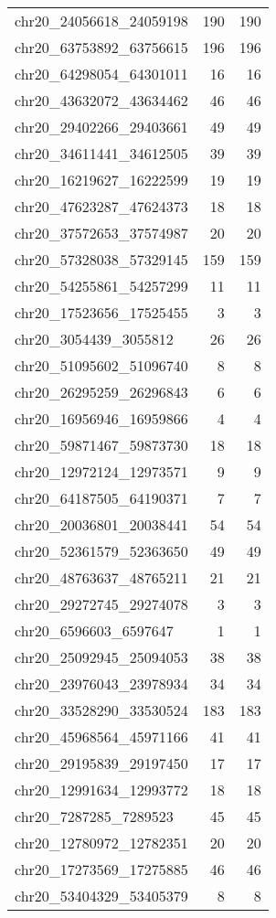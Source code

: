 \begin{longtable}{lrr}
chr20_24056618_24059198 & 190 & 190 \\
chr20_63753892_63756615 & 196 & 196 \\
chr20_64298054_64301011 & 16 & 16 \\
chr20_43632072_43634462 & 46 & 46 \\
chr20_29402266_29403661 & 49 & 49 \\
chr20_34611441_34612505 & 39 & 39 \\
chr20_16219627_16222599 & 19 & 19 \\
chr20_47623287_47624373 & 18 & 18 \\
chr20_37572653_37574987 & 20 & 20 \\
chr20_57328038_57329145 & 159 & 159 \\
chr20_54255861_54257299 & 11 & 11 \\
chr20_17523656_17525455 & 3 & 3 \\
chr20_3054439_3055812 & 26 & 26 \\
chr20_51095602_51096740 & 8 & 8 \\
chr20_26295259_26296843 & 6 & 6 \\
chr20_16956946_16959866 & 4 & 4 \\
chr20_59871467_59873730 & 18 & 18 \\
chr20_12972124_12973571 & 9 & 9 \\
chr20_64187505_64190371 & 7 & 7 \\
chr20_20036801_20038441 & 54 & 54 \\
chr20_52361579_52363650 & 49 & 49 \\
chr20_48763637_48765211 & 21 & 21 \\
chr20_29272745_29274078 & 3 & 3 \\
chr20_6596603_6597647 & 1 & 1 \\
chr20_25092945_25094053 & 38 & 38 \\
chr20_23976043_23978934 & 34 & 34 \\
chr20_33528290_33530524 & 183 & 183 \\
chr20_45968564_45971166 & 41 & 41 \\
chr20_29195839_29197450 & 17 & 17 \\
chr20_12991634_12993772 & 18 & 18 \\
chr20_7287285_7289523 & 45 & 45 \\
chr20_12780972_12782351 & 20 & 20 \\
chr20_17273569_17275885 & 46 & 46 \\
chr20_53404329_53405379 & 8 & 8 \\

\end{longtable}
